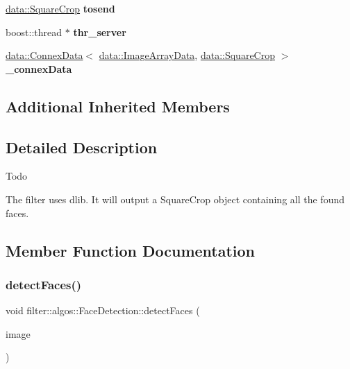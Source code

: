 \begin{DoxyCompactItemize}
\hyperlink{classfilter_1_1data_1_1_square_crop}{data\+::\+Square\+Crop} {\bfseries tosend}
\item 
\mbox{\label{classfilter_1_1algos_1_1_face_detection_add5efbfa77b142f82bcc00cc6a1a5d91}} 
boost\+::thread $\ast$ {\bfseries thr\+\_\+server}
\item 
\mbox{\label{classfilter_1_1algos_1_1_face_detection_a7a24695a45fe28450274c5c179bb844a}} 
\hyperlink{classfilter_1_1data_1_1_connex_data}{data\+::\+Connex\+Data}$<$ \hyperlink{classfilter_1_1data_1_1_image_array_data}{data\+::\+Image\+Array\+Data}, \hyperlink{classfilter_1_1data_1_1_square_crop}{data\+::\+Square\+Crop} $>$ {\bfseries \+\_\+connex\+Data}
\end{DoxyCompactItemize}
\subsection*{Additional Inherited Members}


\subsection{Detailed Description}
\begin{DoxyRefDesc}{Todo}
\item[\hyperlink{todo__todo000008}{Todo}]\end{DoxyRefDesc}
The filter uses dlib. It will output a Square\+Crop object containing all the found faces. 

\subsection{Member Function Documentation}
\mbox{\label{classfilter_1_1algos_1_1_face_detection_a48cb8617d71a9827857e3d2d1e61b3f7}} 
\subsubsection{\texorpdfstring{detect\+Faces()}{detectFaces()}}
{\footnotesize\ttfamily void filter\+::algos\+::\+Face\+Detection\+::detect\+Faces (\begin{DoxyParamCaption}\item[{const \hyperlink{classfilter_1_1data_1_1_image_data}{data\+::\+Image\+Data} \&}]{image }\end{DoxyParamCaption})}


